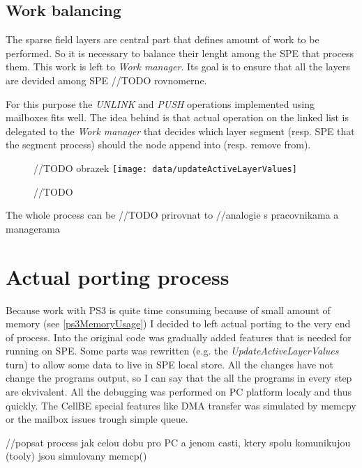 \subsection{Work balancing}

The sparse field layers are central part that defines amount of work to be
performed. So it is necessary to balance their lenght among the SPE that
process them. This work is left to \emph{Work manager}. Its goal is to ensure
that all the layers are devided among SPE //TODO rovnomerne.

For this purpose the \emph{UNLINK} and \emph{PUSH} operations implemented using
mailboxes fits well. The idea behind is that actual operation on the linked
list is delegated to the \emph{Work manager} that decides which layer segment
(resp. SPE that the segment process) should the node append into (resp. remove
from).

\begin{figure}	//TODO obrazek
    \centering
    \texttt{[image: data/updateActiveLayerValues]}
    \caption[Diagram of new design components]{//TODO}
    \label{fg:updateActiveLayerValues}
\end{figure}

The whole process can be //TODO prirovnat to
//analogie s pracovnikama a managerama

\section{Actual porting process}

Because work with PS3 is quite time consuming because of small amount of memory
(see \ref{ps3MemoryUsage}) I decided to left actual porting to the very end of
process. Into the original code was gradually added features that is needed for
running on SPE. Some parts was rewritten (e.g. the
\emph{UpdateActiveLayerValues} turn) to allow some data to live in SPE local
store. All the changes have not change the programs output, so I can say that
the all the programs in every step are ekvivalent. All the debugging was
performed on PC platform localy and thus quickly. The CellBE special features
like DMA transfer was simulated by memcpy or the mailbox issues trough simple
queue.



//popsat process jak celou dobu pro PC a jenom casti, ktery spolu komunikujou (tooly) jsou simulovany memcp()